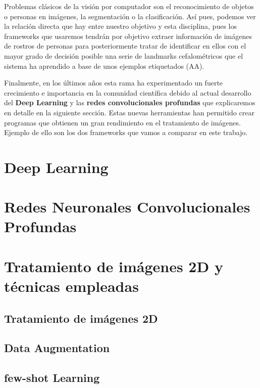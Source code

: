     \medskip
    
    \noindent Problemas clásicos de la visión por computador son el reconocimiento de objetos o personas en imágenes, la segmentación o la clasificación. Así pues, podemos ver la relación directa que hay entre nuestro objetivo y esta disciplina, pues los frameworks que usaremos tendrán por objetivo extraer información de imágenes de rostros de personas para posteriormente tratar de identificar en ellos con el mayor grado de decisión posible una serie de landmarks cefalométricos que el sistema ha aprendido a base de unos ejemplos etiquetados (AA).

    \medskip

    \noindent Finalmente, en los últimos años esta rama ha experimentado un fuerte crecimiento e importancia en la comunidad científica debido al actual desarrollo del \textbf{Deep Learning} y las \textbf{redes convolucionales profundas} que explicaremos en detalle en la siguiente sección. Estas nuevas herramientas han permitido crear programas que obtienen un gran rendimiento en el tratamiento de imágenes. Ejemplo de ello son los dos frameworks que vamos a comparar en este trabajo.

\section{Deep Learning}

\section{Redes Neuronales Convolucionales Profundas}

\section{Tratamiento de imágenes 2D y técnicas empleadas}
    \subsection{Tratamiento de imágenes 2D}

    \subsection{Data Augmentation}

    \subsection{few-shot Learning}

\endinput

